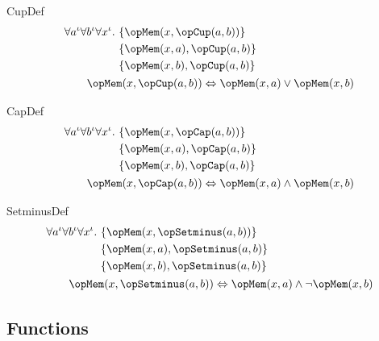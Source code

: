 \documentclass[11pt, a4paper, oneside]{article}
\begin{document}
\begin{axioms}
\item[CupDef] \[
        \begin{aligned}
            &\forall a^\idv \forall b^\idv \forall x^\idv.\, \begin{aligned}[t]
                &\st{ \opMem(x, \opCup(a, b)) } \\
                &\st{ \opMem(x, a), \opCup(a, b) } \\
                &\st{ \opMem(x, b), \opCup(a, b) }
            \end{aligned} \\
            &\qquad \opMem(x, \opCup(a, b)) \eqv \opMem(x, a) \vee \opMem(x, b)
        \end{aligned}
    \]

\item[CapDef] \[
        \begin{aligned}
            &\forall a^\idv \forall b^\idv \forall x^\idv.\, \begin{aligned}[t]
                &\st{ \opMem(x, \opCap(a, b)) } \\
                &\st{ \opMem(x, a), \opCap(a, b) } \\
                &\st{ \opMem(x, b), \opCap(a, b) }
            \end{aligned} \\
            &\qquad \opMem(x, \opCap(a, b)) \eqv \opMem(x, a) \wedge \opMem(x, b)
        \end{aligned}
    \]

\item[SetminusDef] \[
        \begin{aligned}
            &\forall a^\idv \forall b^\idv \forall x^\idv.\, \begin{aligned}[t]
                &\st{ \opMem(x, \opSetminus(a, b)) } \\
                &\st{ \opMem(x, a), \opSetminus(a, b) } \\
                &\st{ \opMem(x, b), \opSetminus(a, b) }
            \end{aligned} \\
            &\qquad \opMem(x, \opSetminus(a, b)) \eqv \opMem(x, a) \wedge \neg \opMem(x, b)
        \end{aligned}
    \]

\end{axioms}


    \subsection{Functions}
    \label{subsec:functions}
\end{document}
